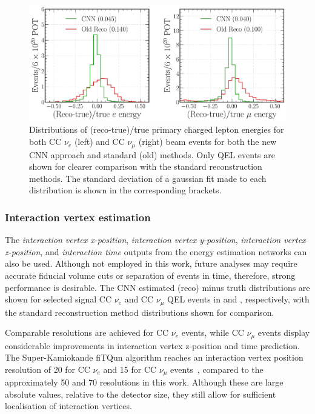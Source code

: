 \begin{figure} %
    \includegraphics[width=\textwidth]{diagrams/7-results/final_frac_e_comparison.pdf}
    \caption[Distributions of (reco-true)/true primary charged lepton energies for the CNN and
        standard methods] {Distributions of (reco-true)/true primary charged lepton energies for
        both CC $\nu_{e}$ (left) and CC $\nu_{\mu}$ (right) beam events for both the new CNN
        approach and standard (old) methods. Only QEL events are shown for clearer comparison with
        the standard reconstruction methods. The standard deviation of a gaussian fit made to each
        distribution is shown in the corresponding brackets.}
    \label{fig:final_frac_e_comparison}
\end{figure}

\subsubsection*{Interaction vertex estimation} %

The \emph{interaction vertex x-position}, \emph{interaction vertex y-position}, \emph{interaction
    vertex z-position}, and \emph{interaction time} outputs from the energy estimation networks
    can also be used. Although not employed in this work, future analyses may require accurate
    fiducial volume cuts or separation of events in time, therefore, strong performance is
    desirable. The CNN estimated (reco) minus truth distributions are shown for selected signal CC
    $\nu_{e}$ and CC $\nu_{\mu}$ QEL events in 
    and , respectively, with the standard
    reconstruction method distributions shown for comparison.

Comparable resolutions are achieved for CC $\nu_{e}$ events, while CC $\nu_{\mu}$ events display
considerable improvements in interaction vertex z-position and time prediction. The
Super-Kamiokande fiTQun algorithm reaches an interaction vertex position resolution of
\SI{20}{} for CC $\nu_{e}$ and \SI{15}{} for CC $\nu_{\mu}$
events~\cite{jiang2019}, compared to the approximately \SI{50}{} and \SI{70}{}
resolutions in this work. Although these are large absolute values, relative to the detector size,
they still allow for sufficient localisation of interaction vertices.

